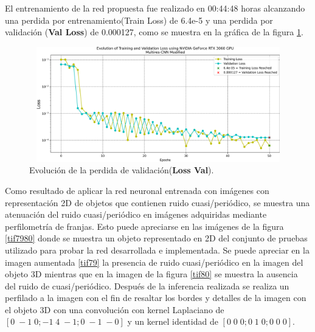 \documentclass[10pt,letterpaper]{article}
\begin{document}
El entrenamiento de la red propuesta fue realizado en 00:44:48 horas alcanzando una perdida por entrenamiento(Train Loss) de 6.4e-5 y una perdida por validación (\textbf{Val Loss}) de 0.000127, como se muestra en la gráfica de la figura \ref{tif71}.

\begin{figure}[H]
	\centering
    \includegraphics[height=5cm,width=12cm]{tifs/tif71.png}
    \caption{Evolución de la perdida de validación(\textbf{Loss Val}).}
    \label{tif71}
\end{figure}


Como resultado de aplicar la red neuronal entrenada con imágenes con representación 2D de objetos que contienen ruido cuasi/periódico, se muestra una atenuación del ruido cuasi/periódico en imágenes adquiridas mediante perfilometría de franjas. Esto puede apreciarse en las imágenes de la figura \ref{tif7980} donde se muestra un objeto representado en 2D del conjunto de pruebas utilizado para probar la red desarrollada e implementada. Se puede apreciar en la imagen aumentada \ref{tif79} la presencia de ruido cuasi/periódico en la imagen del objeto 3D mientras que en la imagen de la figura \ref{tif80} se muestra la ausencia del ruido de cuasi/periódico. Después de la inferencia realizada se realiza un perfilado a la imagen con el fin de resaltar los bordes y detalles de la imagen con el objeto 3D con una convolución con kernel Laplaciano de $[0\; -1\; 0;-1\; 4\; -1; 0\; -1\; -0]$ y un kernel identidad de $[0\; 0\; 0; 0\; 1\; 0; 0\; 0\; 0]$.
\end{document}

